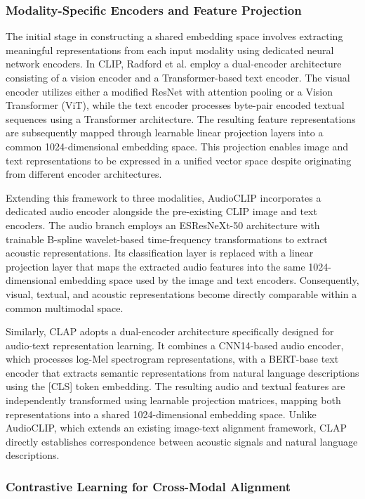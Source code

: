 \documentclass[pdflatex,sn-mathphys-num]{sn-jnl}%
\theoremstyle{thmstyleone}%
\theoremstyle{thmstyletwo}%
\theoremstyle{thmstylethree}%
\begin{document}
\subsubsection{Modality-Specific Encoders and Feature Projection}

The initial stage in constructing a shared embedding space involves extracting meaningful representations from each input modality using dedicated neural network encoders. In CLIP, Radford et al. employ a dual-encoder architecture consisting of a vision encoder and a Transformer-based text encoder. The visual encoder utilizes either a modified ResNet with attention pooling or a Vision Transformer (ViT), while the text encoder processes byte-pair encoded textual sequences using a Transformer architecture. The resulting feature representations are subsequently mapped through learnable linear projection layers into a common 1024-dimensional embedding space. This projection enables image and text representations to be expressed in a unified vector space despite originating from different encoder architectures.

Extending this framework to three modalities, AudioCLIP incorporates a dedicated audio encoder alongside the pre-existing CLIP image and text encoders. The audio branch employs an ESResNeXt-50 architecture with trainable B-spline wavelet-based time-frequency transformations to extract acoustic representations. Its classification layer is replaced with a linear projection layer that maps the extracted audio features into the same 1024-dimensional embedding space used by the image and text encoders. Consequently, visual, textual, and acoustic representations become directly comparable within a common multimodal space.

Similarly, CLAP adopts a dual-encoder architecture specifically designed for audio-text representation learning. It combines a CNN14-based audio encoder, which processes log-Mel spectrogram representations, with a BERT-base text encoder that extracts semantic representations from natural language descriptions using the [CLS] token embedding. The resulting audio and textual features are independently transformed using learnable projection matrices, mapping both representations into a shared 1024-dimensional embedding space. Unlike AudioCLIP, which extends an existing image-text alignment framework, CLAP directly establishes correspondence between acoustic signals and natural language descriptions.

\subsubsection{Contrastive Learning for Cross-Modal Alignment}
\end{document}
